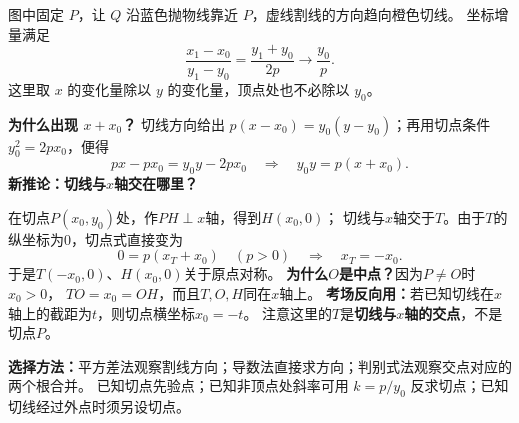 \begin{explanationbox}
\begin{center}\end{center}
图中固定 $P$，让 $Q$ 沿蓝色抛物线靠近 $P$，虚线割线的方向趋向橙色切线。
坐标增量满足
\[
 \frac{x_1-x_0}{y_1-y_0}=\frac{y_1+y_0}{2p}\longrightarrow\frac{y_0}{p}.
\]
这里取 $x$ 的变化量除以 $y$ 的变化量，顶点处也不必除以 $y_0$。

\textbf{为什么出现 $x+x_0$？}
切线方向给出 $p(x-x_0)=y_0(y-y_0)$；再用切点条件 $y_0^2=2px_0$，便得
\[
 px-px_0=y_0y-2px_0\quad\Longrightarrow\quad y_0y=p(x+x_0).
\]
\medskip
\textbf{新推论：切线与$x$轴交在哪里？}
\begin{center}\end{center}
在切点$P(x_0,y_0)$处，作$PH\perp x$轴，得到$H(x_0,0)$；
切线与$x$轴交于$T$。由于$T$的纵坐标为$0$，切点式直接变为
\[
    0=p(x_T+x_0)\quad(p>0)\quad\Longrightarrow\quad x_T=-x_0.
\]
于是$T(-x_0,0)$、$H(x_0,0)$关于原点对称。
\textbf{为什么$O$是中点？}因为$P\ne O$时$x_0>0$，
$TO=x_0=OH$，而且$T,O,H$同在$x$轴上。
\textbf{考场反向用：}若已知切线在$x$轴上的截距为$t$，则切点横坐标$x_0=-t$。
注意这里的$T$是\textbf{切线与$x$轴的交点}，不是切点$P$。

\textbf{选择方法：}平方差法观察割线方向；导数法直接求方向；判别式法观察交点对应的两个根合并。
已知切点先验点；已知非顶点处斜率可用 $k=p/y_0$ 反求切点；已知切线经过外点时须另设切点。
\end{explanationbox}

